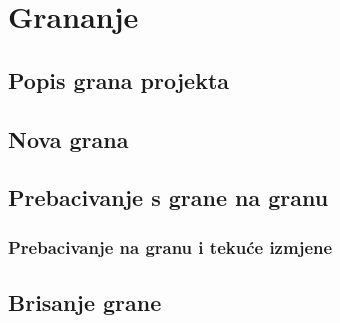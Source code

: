 \chapter*{Grananje}
\clearpage


\clearpage

\section*{Popis grana projekta}
\clearpage


\clearpage


\clearpage


\clearpage

\section*{Nova grana}
\clearpage


\clearpage


\clearpage

\clearpage


\clearpage


\clearpage

\section*{Prebacivanje s grane na granu}
\clearpage


\clearpage


\clearpage


\clearpage


\clearpage

\subsection*{Prebacivanje na granu i tekuće izmjene}
\clearpage

\section*{Brisanje grane}
\clearpage

